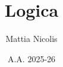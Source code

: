 \documentclass[a4paper,12pt,openright]{book}
\title{\textbf{Logica}}
\author{Mattia Nicolis}
\date{A.A. 2025-26}
\begin{document}
    \maketitle

    \tableofcontents
    \markboth{}{}
\end{document}
